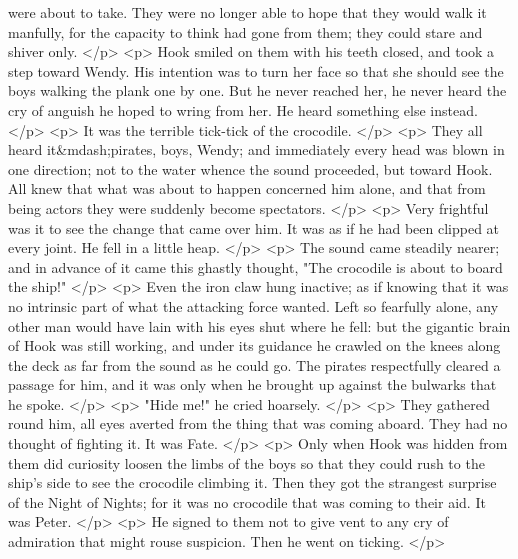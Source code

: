       were about to take. They were no longer able to hope that they would walk
      it manfully, for the capacity to think had gone from them; they could
      stare and shiver only.
    </p>
    <p>
      Hook smiled on them with his teeth closed, and took a step toward Wendy.
      His intention was to turn her face so that she should see the boys walking
      the plank one by one. But he never reached her, he never heard the cry of
      anguish he hoped to wring from her. He heard something else instead.
    </p>
    <p>
      It was the terrible tick-tick of the crocodile.
    </p>
    <p>
      They all heard it&mdash;pirates, boys, Wendy; and immediately every head
      was blown in one direction; not to the water whence the sound proceeded,
      but toward Hook. All knew that what was about to happen concerned him
      alone, and that from being actors they were suddenly become spectators.
    </p>
    <p>
      Very frightful was it to see the change that came over him. It was as if
      he had been clipped at every joint. He fell in a little heap.
    </p>
    <p>
      The sound came steadily nearer; and in advance of it came this ghastly
      thought, "The crocodile is about to board the ship!"
    </p>
    <p>
      Even the iron claw hung inactive; as if knowing that it was no intrinsic
      part of what the attacking force wanted. Left so fearfully alone, any
      other man would have lain with his eyes shut where he fell: but the
      gigantic brain of Hook was still working, and under its guidance he
      crawled on the knees along the deck as far from the sound as he could go.
      The pirates respectfully cleared a passage for him, and it was only when
      he brought up against the bulwarks that he spoke.
    </p>
    <p>
      "Hide me!" he cried hoarsely.
    </p>
    <p>
      They gathered round him, all eyes averted from the thing that was coming
      aboard. They had no thought of fighting it. It was Fate.
    </p>
    <p>
      Only when Hook was hidden from them did curiosity loosen the limbs of the
      boys so that they could rush to the ship's side to see the crocodile
      climbing it. Then they got the strangest surprise of the Night of Nights;
      for it was no crocodile that was coming to their aid. It was Peter.
    </p>
    <p>
      He signed to them not to give vent to any cry of admiration that might
      rouse suspicion. Then he went on ticking.
    </p>
